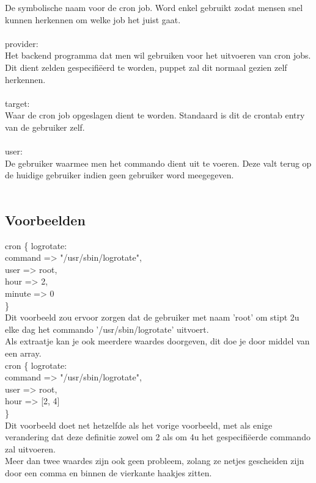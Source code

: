 De symbolische naam voor de cron job. Word enkel gebruikt zodat mensen snel kunnen herkennen om welke job het juist gaat.\\\\
%
provider:\\
Het backend programma dat men wil gebruiken voor het uitvoeren van cron jobs. Dit dient zelden gespecifi\"{e}erd te worden, puppet zal dit normaal gezien zelf herkennen.\\\\
%
target:\\
Waar de cron job opgeslagen dient te worden. Standaard is dit de crontab entry van de gebruiker zelf.\\\\
%
user:\\
De gebruiker waarmee men het commando dient uit te voeren. Deze valt terug op de huidige gebruiker indien geen gebruiker word meegegeven.\\\\

\subsection{Voorbeelden}
	cron \{ logrotate:\\
		command => "/usr/sbin/logrotate",\\
		user => root,\\
		hour => 2,\\
		minute => 0\\
	\}\\

	Dit voorbeeld zou ervoor zorgen dat de gebruiker met naam 'root' om stipt 2u elke dag het commando '/usr/sbin/logrotate' uitvoert.\\
	Als extraatje kan je ook meerdere waardes doorgeven, dit doe je door middel van een array.\\

	cron \{ logrotate:\\
		command => "/usr/sbin/logrotate",\\
		user => root,\\
		hour => [2, 4]\\
	\}\\

	Dit voorbeeld doet net hetzelfde als het vorige voorbeeld, met als enige verandering dat deze definitie zowel om 2 als om 4u het gespecifi\"{e}erde commando zal uitvoeren.\\
	Meer dan twee waardes zijn ook geen probleem, zolang ze netjes gescheiden zijn door een comma en binnen de vierkante haakjes zitten.\\

